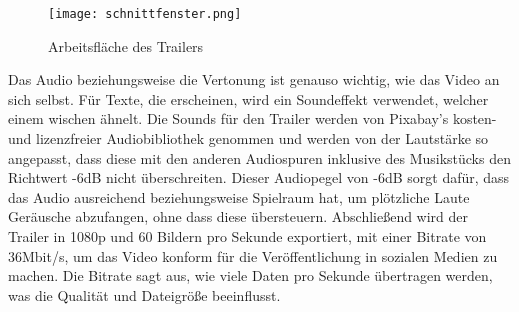 \begin{figure}[H]
    \centering
    \texttt{[image: schnittfenster.png]}
    \caption{Arbeitsfläche des Trailers}
\end{figure}

Das Audio beziehungsweise die Vertonung ist genauso wichtig, wie das Video an sich selbst.
Für Texte, die erscheinen, wird ein Soundeffekt verwendet, welcher einem wischen ähnelt.
Die Sounds für den Trailer werden von Pixabay’s kosten- und lizenzfreier Audiobibliothek genommen und werden von der
Lautstärke so angepasst, dass diese mit den anderen Audiospuren inklusive des Musikstücks den Richtwert -6dB nicht
überschreiten. Dieser Audiopegel von -6dB sorgt dafür, dass das Audio ausreichend  beziehungsweise Spielraum
hat, um plötzliche Laute Geräusche abzufangen, ohne dass diese übersteuern. Abschließend wird der Trailer in 1080p und 60 Bildern pro Sekunde exportiert, mit einer Bitrate von 36Mbit/s, um das Video konform für die Veröffentlichung in sozialen Medien zu machen. Die Bitrate sagt aus, wie viele Daten pro Sekunde übertragen werden, was die Qualität und Dateigröße beeinflusst.



\renewcommand{\kapitelautor}{}
